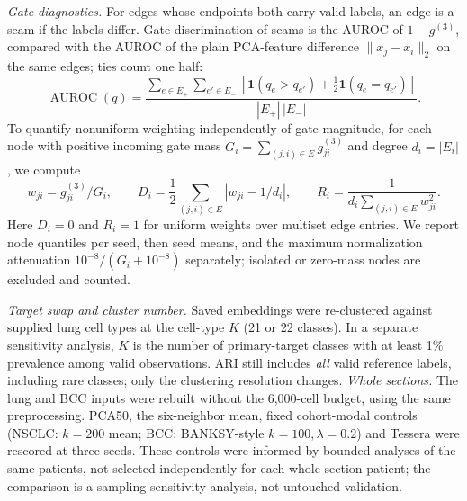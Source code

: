 \documentclass[11pt]{article}
\begin{document}
\emph{Gate diagnostics.} For edges whose endpoints both carry valid labels, an edge is a seam if the labels differ. Gate discrimination of seams is the AUROC of \(1-g^{(3)}\), compared with the AUROC of the plain PCA-feature difference \(\lVert x_j-x_i\rVert_2\) on the same edges; ties count one half:
\begin{equation}
\operatorname{AUROC}(q)=\frac{\sum_{e\in E_+}\sum_{e'\in E_-}
[\mathbf1(q_e>q_{e'})+\tfrac12\mathbf1(q_e=q_{e'})]}{|E_+|\,|E_-|}.\label{eq:auroc}
\end{equation}
To quantify nonuniform weighting independently of gate magnitude, for each node with positive incoming gate mass \(G_i=\sum_{(j,i)\in E}g_{ji}^{(3)}\) and degree \(d_i=|E_i|\), we compute
\begin{equation}
w_{ji}=g_{ji}^{(3)}/G_i,\qquad D_i=\frac12\sum_{(j,i)\in E}|w_{ji}-1/d_i|,\qquad
R_i=\frac{1}{d_i\sum_{(j,i)\in E}w_{ji}^2}.\label{eq:gate-weights}
\end{equation}
Here \(D_i=0\) and \(R_i=1\) for uniform weights over multiset edge entries. We report node quantiles per seed, then seed means, and the maximum normalization attenuation \(10^{-8}/(G_i+10^{-8})\) separately; isolated or zero-mass nodes are excluded and counted.

\emph{Target swap and cluster number.} Saved embeddings were re-clustered against supplied lung cell types at the cell-type \(K\) (21 or 22 classes). In a separate sensitivity analysis, \(K\) is the number of primary-target classes with at least 1\% prevalence among valid observations. ARI still includes \emph{all} valid reference labels, including rare classes; only the clustering resolution changes. \emph{Whole sections.} The lung and BCC inputs were rebuilt without the 6,000-cell budget, using the same preprocessing. PCA50, the six-neighbor mean, fixed cohort-modal controls (NSCLC: \(k=200\) mean; BCC: BANKSY-style \(k=100,\lambda=0.2\)) and Tessera were rescored at three seeds. These controls were informed by bounded analyses of the same patients, not selected independently for each whole-section patient; the comparison is a sampling sensitivity analysis, not untouched validation.
\end{document}
